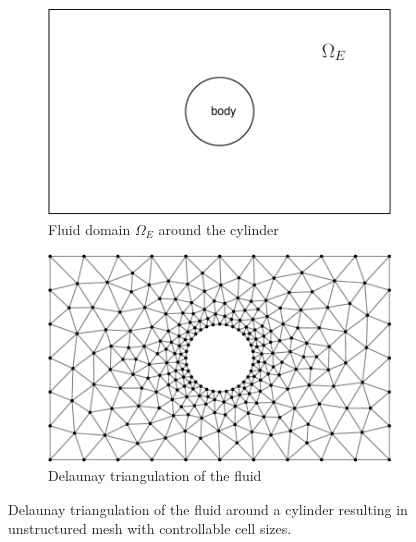 	\begin{figure}[!b]
	        \centering
	        \begin{subfigure}[b]{0.45\textwidth}
	                \includegraphics[width=\textwidth]{figures/eulerian/cylinderPreDelauney-crop.pdf}
	                \caption{Fluid domain $\Omega_E$ around the cylinder}
	                \label{fig:cylinderPreDelauney}
	        \end{subfigure}%
	        \qquad %
	        \begin{subfigure}[b]{0.45\textwidth}
	                \includegraphics[width=\textwidth]{figures/eulerian/cylinderDelauney-crop.pdf}
	                \caption{Delaunay triangulation of the fluid}
	                \label{fig:cylinderDelauney}
	        \end{subfigure}
	        \caption{Delaunay triangulation of the fluid around a cylinder resulting in unstructured mesh with controllable cell sizes.}
	        \label{fig:cylinderFiniteElementDiscretization}
	\end{figure}	

